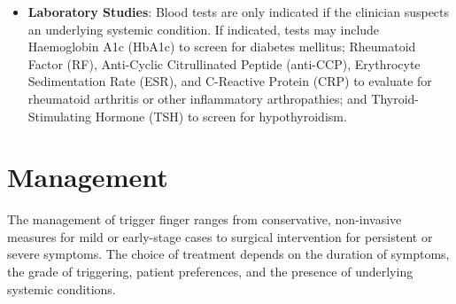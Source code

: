 \begin{itemize}
\begin{itemize}
  \end{itemize}
  \item \textbf{Laboratory Studies}: Blood tests are only indicated if the clinician suspects an underlying systemic condition. If indicated, tests may include Haemoglobin A1c (HbA1c) to screen for diabetes mellitus; Rheumatoid Factor (RF), Anti-Cyclic Citrullinated Peptide (anti-CCP), Erythrocyte Sedimentation Rate (ESR), and C-Reactive Protein (CRP) to evaluate for rheumatoid arthritis or other inflammatory arthropathies; and Thyroid-Stimulating Hormone (TSH) to screen for hypothyroidism.
\end{itemize}

\section*{Management}
The management of trigger finger ranges from conservative, non-invasive measures for mild or early-stage cases to surgical intervention for persistent or severe symptoms. The choice of treatment depends on the duration of symptoms, the grade of triggering, patient preferences, and the presence of underlying systemic conditions.

